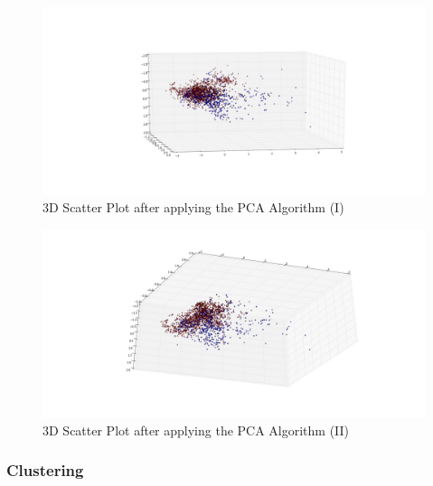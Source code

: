 \documentclass[a4paper,12pt]{report}
\begin{document}
				\begin{figure}[H]
					\centering
					\includegraphics[width=\textwidth,scale=1,totalheight=0.4\textheight]{images/scatter_pca_3D}
					\caption{3D Scatter Plot after applying the PCA Algorithm (I)}
					\label{fig:scatter_pca_3D}
				\end{figure}
				\begin{figure}[H]
					\centering
					\includegraphics[width=\textwidth,scale=1,totalheight=0.4\textheight]{images/scatter_pca_3D_2}
					\caption{3D Scatter Plot after applying the PCA Algorithm (II)}
					\label{fig:scatter_pca_3D_2}
				\end{figure}
			\subsubsection{Clustering}
\end{document}
